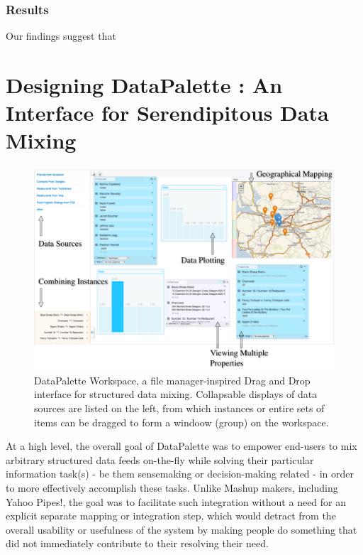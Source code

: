 \documentclass{sigchi}
\begin{document}
\subsubsection{Results}
Our findings suggest that 

\section{Designing DataPalette : An Interface for Serendipitous Data Mixing}
\begin{figure}[htbp]
\begin{center}
\includegraphics[width=18cm]{img/screenshot}
\caption{DataPalette Workspace, a file manager-inspired Drag and Drop interface for structured data mixing. Collapsable displays of data sources are listed on the left, from which instances or entire sets of items can be dragged to form a windoow (group) on the workspace.}
\label{fig:workspace}
\end{center}
\end{figure}

At a high level, the overall goal of DataPalette was to empower end-users to mix arbitrary structured data feeds on-the-fly while solving their particular information task(s) - be them sensemaking or decision-making related - in order to more effectively accomplish these tasks.  Unlike Mashup makers, including Yahoo Pipes!, the goal was to facilitate such integration without a need for an explicit separate mapping or integration step, which would detract from the overall usability or usefulness of the system by making people do something that did not immediately contribute to their resolving their need.
\end{document}
